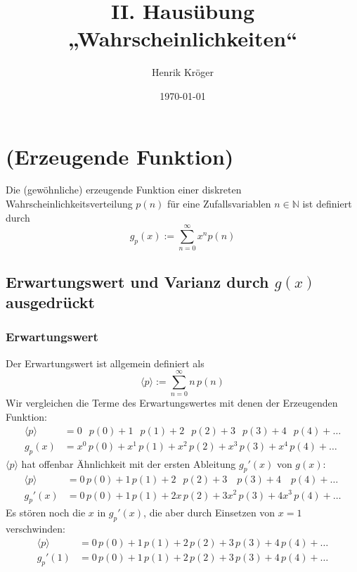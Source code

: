 \documentclass[a4paper]{article}
\title{II. Hausübung „Wahrscheinlichkeiten“}
\author{Henrik Kröger}
\date{\today}
\begin{document}
\maketitle

\section{(Erzeugende Funktion)}
Die (gewöhnliche) erzeugende Funktion
einer diskreten Wahrscheinlichkeitsverteilung $p(n)$
für eine Zufallsvariablen $n\in\mathbb{N}$ ist definiert durch
\begin{equation}
    g_p(x) := \sum_{n=0}^{\infty} x^n p(n)
\end{equation}

\subsection{Erwartungswert und Varianz durch $g(x)$ ausgedrückt}
\subsubsection{Erwartungswert}
Der Erwartungswert ist allgemein definiert als
\begin{equation}
    \langle p \rangle := \sum_{n=0}^{\infty} n \, p(n)
\end{equation}
Wir vergleichen die Terme des Erwartungswertes mit denen der Erzeugenden Funktion:
\begin{align*}
    \langle p \rangle &= 0\;\;\,p(0)   + 1\;\;\,p(1) + 2\;\;\,p(2) + 3\;\;\,p(3) + 4\;\;\,p(4) + \ldots \\
    g_p(x)            &= x^0\,p(0) + x^1\,p(1) + x^2\,p(2) + x^3\,p(3) + x^4\,p(4) + \ldots
\end{align*}
$\langle p \rangle$ hat offenbar Ähnlichkeit mit der ersten Ableitung $g_p'(x)$ von $g(x)$:
\begin{align*}
    \langle p \rangle &= 0\,p(0) + 1\,p(1) + 2\;\;\,p(2) + 3\;\;\;\,p(3) + 4\;\;\;\,p(4) + \ldots \\
    g_p'(x)           &= 0\,p(0) + 1\,p(1) + 2x\,p(2) +    3x^2\,p(3)    + 4x^3\,p(4) + \ldots
\end{align*}
Es stören noch die $x$ in $g_p'(x)$, die aber durch Einsetzen von $x=1$ verschwinden:
\begin{align*}
    \langle p \rangle &= 0\,p(0) + 1\,p(1) + 2\,p(2) + 3\,p(3) + 4\,p(4) + \ldots \\
    g_p'(1)           &= 0\,p(0) + 1\,p(1) + 2\,p(2) + 3\,p(3) + 4\,p(4) + \ldots \\
\end{align*}
\end{document}
